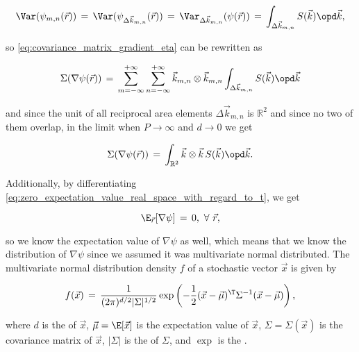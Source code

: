 {\begin{equation}
\Var(\psi_{m,n}(\vec{r})) \,=\, \Var(\psi_{\Delta\vec{k}_{m,n}}(\vec{r})) \,=\, \Var_{\Delta\vec{k}_{m,n}}(\psi(\vec{r})) \,=\, \int_{\Delta\vec{k}_{m,n}}S(\vec{k})\opd\vec{k},
\end{equation}

so \eqref{eq:covariance_matrix_gradient_eta} can be rewritten as

\begin{equation}
\Sigma(\nabla\psi(\vec{r})) \,=\, \sum_{m=-\infty}^{+\infty}\sum_{n=-\infty}^{+\infty}\vec{k}_{m,n}\otimes\vec{k}_{m,n} \int_{\Delta\vec{k}_{m,n}}S(\vec{k})\opd\vec{k}
\end{equation}

and since the unit of all reciprocal area elements $\Delta\vec{k}_{m,n}$ is $\mathbb{R}^2$ and since no two of them overlap, in the limit when $P\to\infty$ and $d\to 0$ we get

\begin{equation} \label{eq:covariance_matrix_gradient_eta_final}
\Sigma(\nabla\psi(\vec{r})) \,=\, \int_{\mathbb{R}^2}\vec{k}\otimes\vec{k}\,S(\vec{k})\opd\vec{k}.
\end{equation}

Additionally, by differentiating \eqref{eq:zero_expectation_value_real_space_with_regard_to_t}, we get

\begin{equation} \label{eq:psi_of_r_expectation_value}
\E_{\vec{r}}[\nabla\psi] \,=\, 0,\ \forall\ \vec{r},
\end{equation}

so we know the expectation value of $\nabla\psi$ as well, which means that we know the distribution of $\nabla\psi$ since we assumed it was multivariate normal distributed. The multivariate normal distribution density $f$ of a stochastic vector $\vec{x}$ is given by

\begin{equation} \label{eq:multivariate_normal_distribution_density}
f(\vec{x}) \,=\, \frac{1}{(2\pi)^{d/2}|\Sigma|^{1/2}}\exp\left(-\frac{1}{2}(\vec{x}-\vec{\mu})^{\T}\Sigma^{-1}(\vec{x}-\vec{\mu})\right),
\end{equation}

where $d$ is the \dimensionality of $\vec{x}$, $\vec{\mu} = \E[\vec{x}]$ is the expectation value of $\vec{x}$, $\Sigma = \Sigma(\vec{x})$ is the covariance matrix of $\vec{x}$, $|\Sigma|$ is the \determinant of $\Sigma$, and $\exp$ is the .

}
